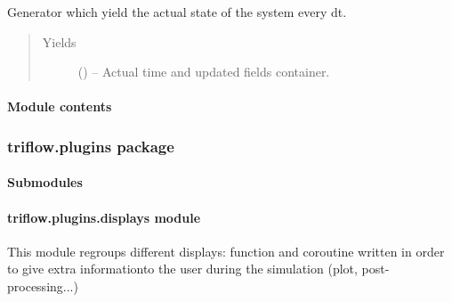 \documentclass[letterpaper,10pt,english]{sphinxmanual}
\begin{document}
\begin{fulllineitems}
\begin{fulllineitems}
\end{fulllineitems}


\begin{fulllineitems}
\label{\detokenize{triflow.core:triflow.core.simulation.Simulation.compute}}
Generator which yield the actual state of the system every dt.
\begin{quote}\begin{description}
\item[{Yields}] \leavevmode
{} () -- Actual time and updated fields container.

\end{description}\end{quote}

\end{fulllineitems}


\end{fulllineitems}



\paragraph{Module contents}
\label{\detokenize{triflow.core:module-triflow.core}}\label{\detokenize{triflow.core:module-contents}}

\subsubsection{triflow.plugins package}
\label{\detokenize{triflow.plugins::doc}}\label{\detokenize{triflow.plugins:triflow-plugins-package}}

\paragraph{Submodules}
\label{\detokenize{triflow.plugins:submodules}}

\paragraph{triflow.plugins.displays module}
\label{\detokenize{triflow.plugins:module-triflow.plugins.displays}}\label{\detokenize{triflow.plugins:triflow-plugins-displays-module}}
This module regroups different displays: function and coroutine written
in order to give extra informationto the user during the simulation
(plot, post-processing...)
\end{document}
